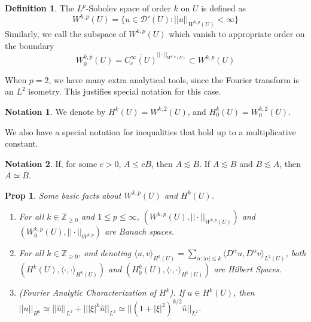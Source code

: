 \documentclass[letterpaper,10pt]{article}
\newcommand{\wkp}{W^{k,p}}
\newcommand{\lsim}{\lesssim}
\theoremstyle{definition}
\newtheorem{dfn}{Definition}
\newtheorem*{ntt}{Notation}
\theoremstyle{remark}
\theoremstyle{plain}
\newtheorem{prop}[thm]{Prop}
\begin{document}
\begin{dfn}
    The $L^p$-Sobolev space of order $k$ on $U$ is defined as
    $$
    W^{k,p}(U)=\{u\in\mathcal D'(U):||u||_{W^{k,p}(U)}<\infty\}
    $$
    Similarly, we call the subspace of $W^{k,p}(U)$ which vanish to appropriate 
    order on the boundary
    $$
    W_0^{k,p}(U)=\overline{C_c^\infty(U)}^{||\cdot||_{W^{k,p}(U)}}\subset W^{k,p}(U)
    $$
\end{dfn}
When $p=2$, we have many extra analytical tools, since the Fourier transform
is an $L^2$ isometry. This justifies special notation for this case.
\begin{ntt}
    We denote by $H^k(U)=W^{k,2}(U)$, and $H_0^k(U)=W_0^{k,2}(U)$.
\end{ntt}
We also have a special notation for inequalities that hold up to a multiplicative
constant.
\begin{ntt}
    If, for some $c>0$, $A\leq cB$, then $A\lsim B$.
    If $A\lsim B$ and $B\lsim A$, then $A\simeq B$.
\end{ntt}
\begin{prop}\label{prop:wkpbasics}
    Some basic facts about $W^{k,p}(U)$ and $H^k(U)$.
    \begin{enumerate}[label=\roman*.]
        \item For all $k\in\mathbb Z_{\geq 0}$ and $1\leq p\leq\infty$,
            $(\wkp(U),||\cdot||_{W^{k,p}(U)})$ and $(\wkp_0(U),||\cdot||_{\wkp})$
            are Banach spaces.

        \item For all $k\in\mathbb Z_{\geq 0}$, and denoting 
            $\langle u,v\rangle_{H^k(U)}=
            \sum_{\alpha:|\alpha|\leq k}^{}\langle D^\alpha u,D^\alpha v\rangle_{L^2(U)}$,
            both $(H^k(U),\langle\cdot,\cdot\rangle_{H^k(U)})$ and
            $(H^k_0(U),\langle\cdot,\cdot\rangle_{H^k(U)})$ are Hilbert Spaces.

        \item (Fourier Analytic Characterization of $H^k$). If $u\in H^k(U)$,
            then $||u||_{H^k}\simeq ||\hat u||_{L^2}+|||\xi|^k\hat u||_{L^2}
            \simeq ||(1+|\xi|^2)^{k/2}\hat u||_{L^2}$.
    \end{enumerate}
\end{prop}
\end{document}
